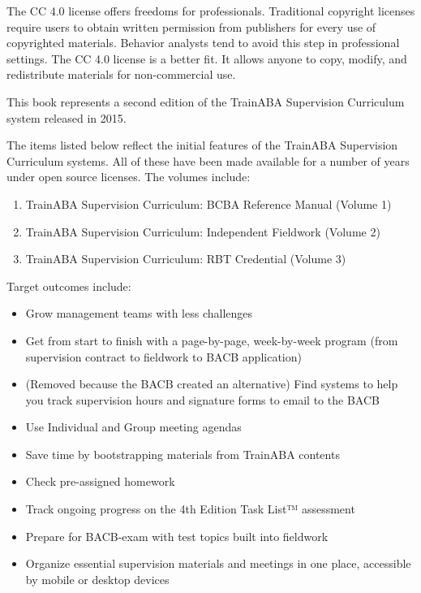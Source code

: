 The CC 4.0 license offers freedoms for professionals. Traditional copyright licenses require users to obtain written permission from publishers for every use of copyrighted materials. Behavior analysts tend to avoid this step in professional settings. The CC 4.0 license is a better fit. It allows anyone to copy, modify, and redistribute materials for non-commercial use. 

This book represents a second edition of the TrainABA Supervision Curriculum system released in 2015.

The items listed below reflect the initial features of the TrainABA Supervision Curriculum systems. All of these have been made available for a number of years under open source licenses. The volumes include:

\begin{enumerate}
\item TrainABA Supervision Curriculum: BCBA Reference Manual (Volume 1)
\item TrainABA Supervision Curriculum: Independent Fieldwork (Volume 2)
\item TrainABA Supervision Curriculum: RBT Credential (Volume 3)
\end{enumerate}

Target outcomes include: 
\begin{itemize}
\item Grow management teams with less challenges
\item Get from start to finish with a page-by-page, week-by-week program (from supervision contract to  fieldwork to BACB\textregistered{}{} application) 
\item (Removed because the BACB\textregistered{}{} created an alternative) Find systems to help you track supervision hours and signature forms to email to the BACB\textregistered{}
\item Use Individual and Group meeting agendas
\item Save time by bootstrapping materials from TrainABA contents 
\item Check pre-assigned homework
\item Track ongoing progress on the 4th Edition Task List™ assessment 
\item Prepare for BACB\textregistered{}-exam with test topics built into fieldwork
\item Organize essential supervision materials and meetings in one place, accessible by mobile or desktop devices
\end{itemize}

